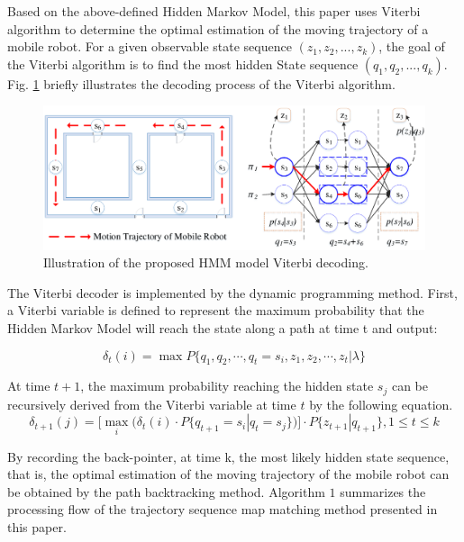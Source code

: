 \documentclass{llncs}
\begin{document}
Based on the above-defined Hidden Markov Model, this paper uses Viterbi algorithm to determine the optimal estimation of the moving trajectory of a mobile robot. For a given observable state sequence $({z_1},{z_2},...,{z_k})$, the goal of the Viterbi algorithm is to find the most hidden State sequence $({q_1},{q_2},...,{q_k})$. Fig. \ref{fig-viterbi} briefly illustrates the decoding process of the Viterbi algorithm.

\begin{figure}[!htbp]
	\centering
	\includegraphics[width=4.976in]{RobotMatch-ViterbiDecoding}
	\caption{Illustration of the proposed HMM model Viterbi decoding.}
	\label{fig-viterbi}
\end{figure}

The Viterbi decoder is implemented by the dynamic programming method. First, a Viterbi variable is defined to represent the maximum probability that the Hidden Markov Model will reach the state along a path at time t and output:

\begin{equation}
	{\delta _t}(i) = \max P\{ {q_1},{q_2}, \cdots ,{q_t} = {s_i},{z_1},{z_2}, \cdots ,{z_t}|\lambda \}
\end{equation}

At time $t+1$, the maximum probability reaching the hidden state $s_j$ can be recursively derived from the Viterbi variable at time $t$ by the following equation. 
\begin{equation}
	{\delta _{t + 1}}(j) = [\mathop {\max }\limits_i ({\delta _t}(i) \cdot P\{ {q_{t + 1}} = {s_i}|{q_t} = {s_j}\} )] \cdot P\{ {z_{t + 1}}|{q_{t + 1}}\} ,1 \le t \le k
\end{equation}

By recording the back-pointer, at time k, the most likely hidden state sequence, that is, the optimal estimation of the moving trajectory of the mobile robot can be obtained by the path backtracking method. Algorithm $1$ summarizes the processing flow of the trajectory sequence map matching method presented in this paper.
\end{document}
